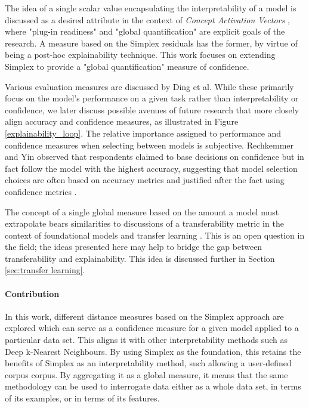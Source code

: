 \documentclass{article}
\begin{document}
The idea of a single scalar value encapsulating the interpretability of a model is discussed as a desired attribute in the context of \textit{Concept Activation Vectors} \cite{kim_interpretability_2018}, where "plug-in readiness" and "global quantification" are explicit goals of the research. A measure based on the Simplex residuals has the former, by virtue of being a post-hoc explainability technique. This work focuses on extending Simplex to provide a "global quantification" measure of confidence.

Various evaluation measures are discussed by Ding et al. \cite{ding_model_2018} While these primarily focus on the model's performance on a given task rather than interpretability or confidence, we later discuss possible avenues of future research that more closely align accuracy and confidence measures, as illustrated in Figure \ref{explainability_loop}.
The relative importance assigned to performance and confidence measures when selecting between models is subjective. Rechkemmer and Yin observed that respondents claimed to base decisions on confidence but in fact follow the model with the highest accuracy, suggesting that model selection choices are often based on accuracy metrics and justified after the fact using confidence metrics \cite{rechkemmer_when_2022}.

The concept of a single global measure based on the amount a model must extrapolate bears similarities to discussions of a transferability metric in the context of foundational models and transfer learning \cite{zhuang_comprehensive_2021} \cite{weber_transfer_2021} \cite{pan_survey_2010}. This is an open question in the field; the ideas presented here may help to bridge the gap between transferability and explainability. This idea is discussed further in Section \ref{sec:transfer learning}.


\paragraph{Contribution}
In this work, different distance measures based on the Simplex approach are explored which can serve as a confidence measure for a given model applied to a particular data set.
This aligns it with other interpretability methods such as Deep k-Nearest Neighbours.
By using Simplex as the foundation, this retains the benefits of Simplex as an interpretability method, such allowing a user-defined corpus corpus. By aggregating it as a global measure, it means that the same methodology can be used to interrogate data either as a whole data set, in terms of its examples, or in terms of its features.
\end{document}
